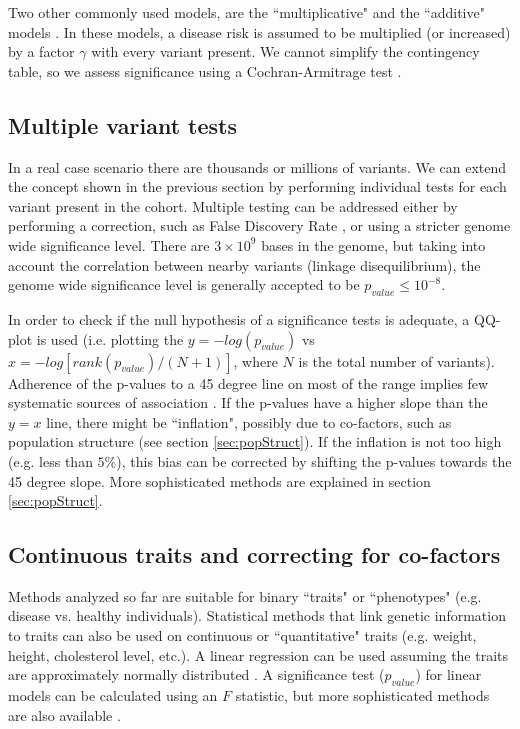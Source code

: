 Two other commonly used models, are the ``multiplicative" and the ``additive" models \cite{balding2006tutorial,clarke2011basic}. In these models, a disease risk is assumed to be multiplied (or increased) by a factor $\gamma$ with every variant present. We cannot simplify the contingency table, so we assess significance using a Cochran-Armitrage test \cite{clarke2011basic}.

\subsection{Multiple variant tests}

In a real case scenario there are thousands or millions of variants. We can extend the concept shown in the previous section by performing individual tests for each variant present in the cohort. Multiple testing can be addressed either by performing a correction, such as False Discovery Rate \cite{balding2006tutorial, clarke2011basic}, or using a stricter genome wide significance level. There are $3 \times 10^9$ bases in the genome, but taking into account the correlation between nearby variants (linkage disequilibrium), the genome wide significance level is generally accepted to be $p_{value} \leq 10^{-8}$.

In order to check if the null hypothesis of a significance tests is adequate, a QQ-plot is used (i.e. plotting the $y = -log(p_{value})$ vs $x = -log[ rank(p_{value}) / (N+1) ]$, where $N$ is the total number of variants). Adherence of the p-values to a 45 degree line on most of the range implies few systematic sources of association \cite{balding2006tutorial, clarke2011basic}. If the p-values have a higher slope than the $y=x$ line, there might be ``inflation", possibly due to co-factors, such as population structure (see section \ref{sec:popStruct}). If the inflation is not too high (e.g. less than $5\%$), this bias can be corrected by shifting the p-values towards the 45 degree slope. More sophisticated methods are explained in section \ref{sec:popStruct}.

\subsection{Continuous traits and correcting for co-factors}

Methods analyzed so far are suitable for binary ``traits" or ``phenotypes" (e.g. disease vs. healthy individuals). Statistical methods that link genetic information to traits can also be used on continuous or ``quantitative" traits (e.g. weight, height, cholesterol level, etc.). A linear regression can be used assuming the traits are approximately normally distributed \cite{balding2006tutorial, clarke2011basic}. A significance test ($p_{value}$) for linear models can be calculated using an $F$ statistic, but more sophisticated methods are also available \cite{balding2006tutorial, clarke2011basic}.

